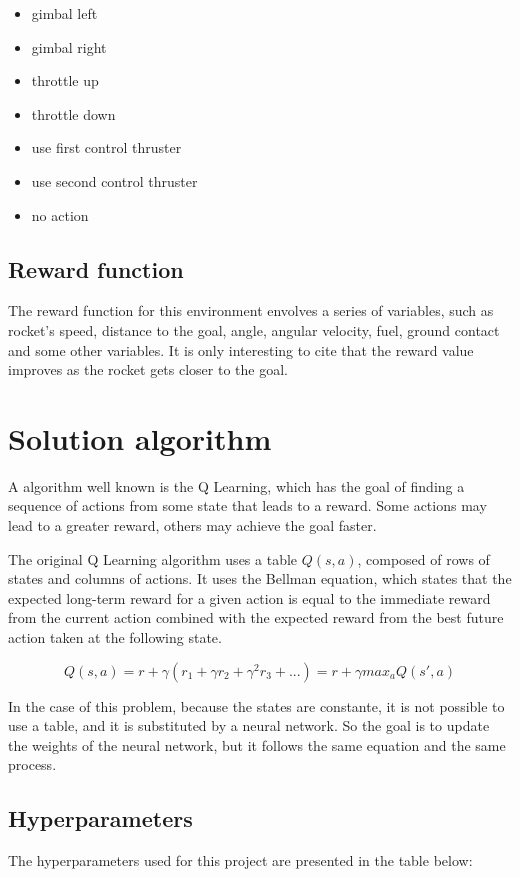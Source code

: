 \documentclass{article}
\begin{document}
\begin{itemize}
	\item gimbal left
    \item gimbal right
    \item throttle up
    \item throttle down
    \item use first control thruster
    \item use second control thruster
    \item no action
\end{itemize}

\subsection{Reward function}
The reward function for this environment envolves a series of variables, such as rocket's speed, distance to the goal, angle, angular velocity, fuel, ground contact and some other variables. It is only interesting to cite that the reward value improves as the rocket gets closer to the goal.

\section{Solution algorithm}
A algorithm well known is the Q Learning, which has the goal of finding a sequence of actions from some state that leads to a reward. Some actions may lead to a greater reward, others may achieve the goal faster.

The original Q Learning algorithm uses a table $Q(s,a)$, composed of rows of states and columns of actions. It uses the Bellman equation, which states that the expected long-term reward for a given action is equal to the immediate reward from the current action combined with the expected reward from the best future action taken at the following state.

\[Q(s,a)=r+\gamma(r_1+\gamma r_2+\gamma^2 r_3+...)=r+\gamma max_a Q(s',a)\]

In the case of this problem, because the states are constante, it is not possible to use a table, and it is substituted by a neural network. So the goal is to update the weights of the neural network, but it follows the same equation and the same process.

\subsection{Hyperparameters}
The hyperparameters used for this project are presented in the table below:
\end{document}
